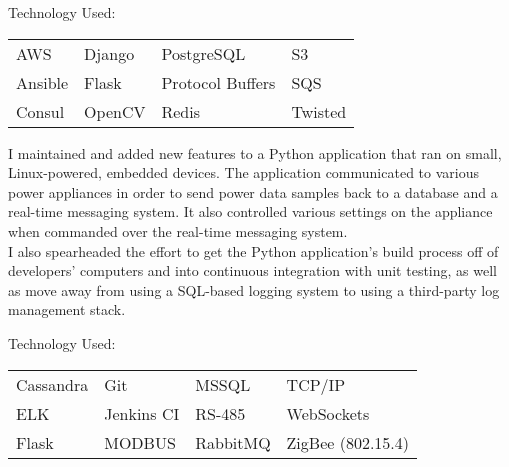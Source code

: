 \documentclass[letterpaper]{deedy-resume} %
\begin{document}
\begin{minipage}[t]{0.66\textwidth}
Technology Used:\\
\begin{tabular}{llll}
AWS & Django & PostgreSQL & S3\\
Ansible & Flask & Protocol Buffers & SQS\\
Consul & OpenCV & Redis & Twisted\\
\end{tabular}

\sectionspace %




I maintained and added new features to a Python application that ran on small, Linux-powered, embedded devices.
The application communicated to various power appliances in order to send power data samples back to a database and a real-time messaging system.
It also controlled various settings on the appliance when commanded over the real-time messaging system.\\[1em]
I also spearheaded the effort to get the Python application's build process off of developers' computers and into continuous integration with unit testing,
as well as move away from using a SQL-based logging system to using a third-party log management stack.
\sectionspace

Technology Used:\\
\begin{tabular}{llll}
Cassandra & Git & MSSQL & TCP/IP\\
ELK & Jenkins CI & RS-485 & WebSockets\\
Flask & MODBUS & RabbitMQ & ZigBee (802.15.4)\\
\end{tabular}

\sectionspace %





\end{minipage}
\end{document}
